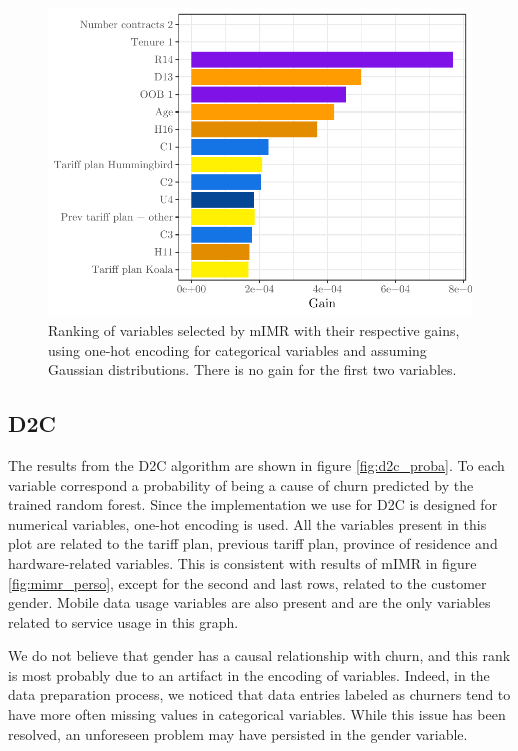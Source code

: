 \begin{figure}
    \centering
    \includegraphics[width=0.9\linewidth]{figures/mimr_original.pdf}
    \caption{Ranking of variables selected by mIMR with their respective gains,
    using one-hot encoding for categorical variables and assuming Gaussian
    distributions. There is no gain for the first two variables.}
    \label{fig:mimr_original}
\end{figure}

\subsection{D2C}

The results from the D2C algorithm are shown in figure \ref{fig:d2c_proba}. To
each variable correspond a probability of being a cause of churn predicted by
the trained random forest. Since the implementation we use for D2C is designed
for numerical variables, one-hot encoding is used. All the variables present in
this plot are related to the tariff plan, previous tariff plan, province of
residence and hardware-related variables. This is consistent with results of
mIMR in figure \ref{fig:mimr_perso}, except for the second and last rows,
related to the customer gender. Mobile data usage variables are also present and
are the only variables related to service usage in this graph.

We do not believe that gender has a causal relationship with churn, and this
rank is most probably due to an artifact in the encoding of variables. Indeed,
in the data preparation process, we noticed that data entries labeled as
churners tend to have more often missing values in categorical variables. While
this issue has been resolved, an unforeseen problem may have persisted in the
gender variable.

